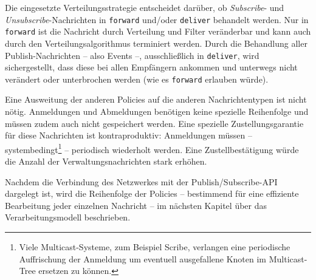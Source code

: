 \begin{table}[!h]
\caption{Verbindungsmatrix}
\label{tab:verbindungsmatrix}
\end{table}

Die eingesetzte Verteilungsstrategie entscheidet darüber, ob \emph{Subscribe}- und \emph{Unsubscribe}-Nachrichten in \texttt{forward} und/oder \texttt{deliver} behandelt werden. Nur in \texttt{forward} ist die Nachricht durch Verteilung und Filter veränderbar und kann auch durch den Verteilungsalgorithmus terminiert werden. Durch die Behandlung aller Publish-Nachrichten -- also Events --, ausschließlich in \texttt{deliver}, wird sichergestellt, dass diese bei allen Empfängern ankommen und unterwegs nicht verändert oder unterbrochen werden (wie es \texttt{forward} erlauben würde).

Eine Ausweitung der anderen Policies auf die anderen Nachrichtentypen ist nicht nötig. Anmeldungen und Abmeldungen benötigen keine spezielle Reihenfolge und müssen zudem auch nicht gespeichert werden. Eine spezielle Zustellungsgarantie für diese Nachrichten ist  kontraproduktiv:  Anmeldungen müssen -- systembedingt\footnote{Viele Multicast-Systeme, zum Beispiel Scribe, verlangen eine periodische Auffrischung der Anmeldung um eventuell ausgefallene Knoten im Multicast-Tree ersetzen zu können.} -- periodisch wiederholt werden. Eine Zustellbestätigung würde die Anzahl der Verwaltungsnachrichten stark erhöhen.

Nachdem die Verbindung des Netzwerkes mit der Publish/Subscribe-API dargelegt ist, wird die Reihenfolge der Policies -- bestimmend für eine effiziente Bearbeitung jeder einzelnen Nachricht -- im nächsten Kapitel über das Verarbeitungsmodell beschrieben.

